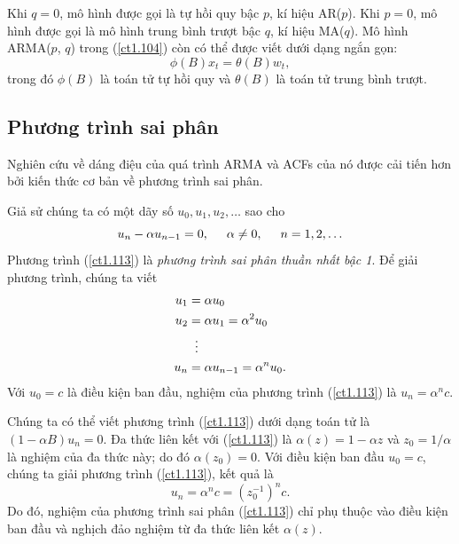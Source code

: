 \documentclass[12pt, a4paper,oneside]{book}
\theoremstyle{definition}
\begin{document}
Khi $q = 0$, mô hình được gọi là tự hồi quy bậc $p$, kí hiệu AR($p$). Khi $p = 0$, mô hình được gọi là mô hình trung bình trượt bậc $q$, kí hiệu MA($q$). Mô hình ARMA($p$, $q$) trong (\ref{ct1.104}) còn có thể được viết dưới dạng ngắn gọn:
\begin{equation}
\phi(B)x_{t}= \theta(B)w_{t}, \label{ct1.106}
\end{equation}
trong đó $\phi(B) $ là toán tử tự hồi quy và $\theta(B)$ là toán tử trung bình trượt.

\subsection{\label{ptsp}Phương trình sai phân}
Nghiên cứu về dáng điệu của quá trình ARMA và ACFs của nó được cải tiến hơn bởi kiến thức cơ bản về phương trình sai phân.

Giả sử chúng ta có một dãy số $u_{0}, u_{1}, u_{2}, \dots$ sao cho
\begin{equation}
u_{n} - \alpha u_{n-1} =0, \hspace{0.5cm} \alpha \neq 0, \hspace{0.5cm}  n=1, 2, \dots \label{ct1.113}
\end{equation}
Phương trình (\ref{ct1.113}) là \textit{phương trình sai phân thuần nhất bậc 1}. Để giải phương trình, chúng ta viết
\begin{align*}
u_{1}&= \alpha u_{0}\\
u_{2}&=\alpha u_{1}= \alpha^{2} u_{0}\\
& \hspace{0.2cm}\vdots\\
u_{n}&=\alpha u_{n-1} =\alpha^{n} u_{0}.	
\end{align*}
Với $u_{0}=c$ là điều kiện ban đầu, nghiệm của phương trình (\ref{ct1.113}) là $u_{n}=\alpha^{n}c$.

Chúng ta có thể viết phương trình (\ref{ct1.113}) dưới dạng toán tử là $(1-\alpha B) u_{n}=0$. Đa thức liên kết với (\ref{ct1.113}) là $\alpha (z) =1-\alpha z$ và  $z_{0}= 1/ \alpha$ là nghiệm của đa thức này; do đó $\alpha (z_{0}) =0$. Với điều kiện ban đầu $u_{0}=c$, chúng ta giải phương trình (\ref{ct1.113}), kết quả là
$$u_{n}=\alpha^{n}c=(z_{0}^{-1})^{n}c.$$
Do đó, nghiệm của phương trình sai phân (\ref{ct1.113}) chỉ phụ thuộc vào điều kiện ban đầu và nghịch đảo nghiệm từ đa thức liên kết $\alpha(z)$.
\end{document}

